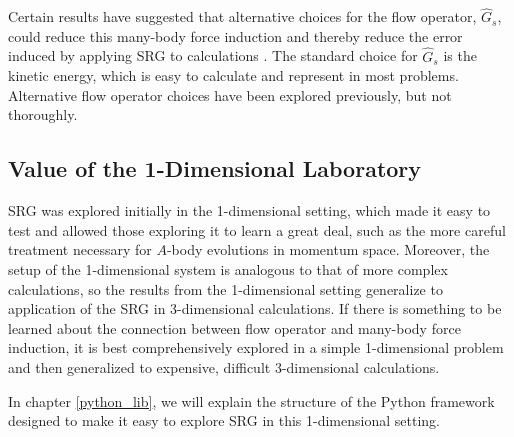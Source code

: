 Certain results have suggested that alternative choices for the flow operator, $\hat{G}_s$, could reduce this many-body force induction and thereby reduce the error induced by applying SRG to calculations \cite{Dicaire:2014fra}. The standard choice for $\hat{G}_s$ is the kinetic energy, which is easy to calculate and represent in most problems. Alternative flow operator choices have been explored previously, but not thoroughly.

\subsection{Value of the 1-Dimensional Laboratory}

SRG was explored initially in the 1-dimensional setting, which made it easy to test and allowed those exploring it to learn a great deal, such as the more careful treatment necessary for $A$-body evolutions in momentum space. Moreover, the setup of the 1-dimensional system is analogous to that of more complex calculations, so the results from the 1-dimensional setting generalize to application of the SRG in 3-dimensional calculations. If there is something to be learned about the connection between flow operator and many-body force induction, it is best comprehensively explored in a simple 1-dimensional problem and then generalized to expensive, difficult 3-dimensional calculations.

In chapter \ref{python_lib}, we will explain the structure of the Python framework designed to make it easy to explore SRG in this 1-dimensional setting.